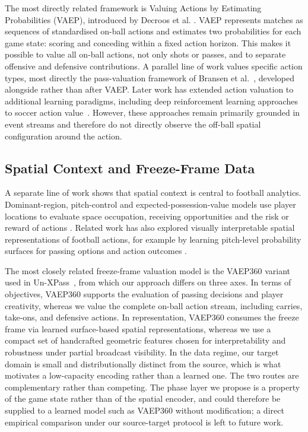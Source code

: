 \documentclass[runningheads]{llncs}
\begin{document}
The most directly related framework is Valuing Actions by Estimating Probabilities (VAEP), introduced by Decroos et al. \cite{decroos2019actions}. VAEP represents matches as sequences of standardised on-ball actions and estimates two probabilities for each game state: scoring and conceding within a fixed action horizon. This makes it possible to value all on-ball actions, not only shots or passes, and to separate offensive and defensive contributions. A parallel line of work values specific action types, most directly the pass-valuation framework of Bransen et al.~\cite{bransen2019passes}, developed alongside rather than after VAEP. Later work has extended action valuation to additional learning paradigms, including deep reinforcement learning approaches to soccer action value~\cite{liu2020deep}. However, these approaches remain primarily grounded in event streams and therefore do not directly observe the off-ball spatial configuration around the action.

\subsection{Spatial Context and Freeze-Frame Data}

A separate line of work shows that spatial context is central to football analytics. Dominant-region, pitch-control and expected-possession-value models use player locations to evaluate space occupation, receiving opportunities and the risk or reward of actions \cite{taki2000dominant,spearman2018beyond,power2017passes,fernandez2018wide,fernandez2021framework}. Related work has also explored visually interpretable spatial representations of football actions, for example by learning pitch-level probability surfaces for passing
options and action outcomes \cite{fernandez2021soccermap}.

The most closely related freeze-frame valuation model is the VAEP360 variant used in Un-XPass~\cite{robberechts2023unxpass}, from which our approach differs on three axes. In terms of objectives, VAEP360 supports the evaluation of passing decisions and player creativity, whereas we value the complete on-ball action stream, including carries, take-ons, and defensive actions. In representation, VAEP360 consumes the freeze frame via learned surface-based spatial representations, whereas we use a compact set of handcrafted geometric features chosen for interpretability and robustness under partial broadcast visibility. In the data regime, our target domain is small and distributionally distinct from the source, which is what motivates a low-capacity encoding rather than a learned one. The two routes are complementary rather than competing. The phase layer we propose is a property of the game state rather than of the spatial encoder, and could therefore be supplied to a learned model such as VAEP360 without modification; a direct empirical comparison under our source-target protocol is left to future work.
\end{document}
